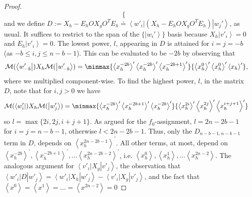 \documentclass{theoretics}
\begin{document}
\begin{proof}
\begin{displaymath}
\begin{cases}
    \end{cases}
  \end{displaymath}and we define $D:=X_{h}-E_{h}OX_{g}O^{T}E_{h}\doteq\left\langle w'_{i}\right|\left(X_{h}-E_{h}OX_{g}O^{T}E_{h}\right)\left|w_{j}'\right\rangle$, as usual.
  It suffices to restrict to the span of the $\{\left|w_{i}'\right\rangle \}$
  basis because $X_{h}\left|v'_{i}\right\rangle =0$ and $E_{h}\left|v'_{i}\right\rangle =0$.
  The lowest power, $l$, appearing in $D$ is attained for $i=j=-b$ (as $-b\le i,j\le n-b-1$).
  This can be evaluated to be $-2b$ by observing that
  \begin{displaymath}
    \mathcal{M}(\left\langle w'_{-b}\right|)X_{h}\mathcal{M}(\left|w'_{-b}\right\rangle )=\minmax{\left\langle x_{h}^{-2b}\right\rangle ^{\prime}\left\langle x_{h}^{-2b}\right\rangle ^{\prime}\left\langle x_{h}^{-2b+1}\right\rangle ^{\prime}}{\left\langle x_{h}^{0}\right\rangle ^{\prime}\left\langle x_{h}^{0}\right\rangle ^{\prime}\left\langle x_{h}\right\rangle ^{\prime}},
  \end{displaymath}
  where we multiplied component-wise. To find the highest power, $l$,
  in the matrix $D$, note that for $i,j>0$ we have
  \begin{displaymath}
    \mathcal{M}(\left\langle w'_{i}\right|)X_{h}\mathcal{M}(\left|w'_{j}\right\rangle )=\minmax{\left\langle x_{h}^{-2b}\right\rangle ^{\prime}\left\langle x_{h}^{-2b+1}\right\rangle ^{\prime}\left\langle x_{h}^{-2b}\right\rangle ^{\prime}}{\left\langle x_{h}^{2i}\right\rangle ^{\prime}\left\langle x_{h}^{2j}\right\rangle ^{\prime}\left\langle x_{h}^{i+j+1}\right\rangle ^{\prime}}
  \end{displaymath}
  so $l=\max\{2i,2j,i+j+1\}$. As argued for the $f_{0}$-assignment,
  $l=2n-2b-1$ for $i=j=n-b-1$, otherwise $l<2n-2b-1$.
  Thus, only the $D_{n-b-1,n-b-1}$ term in $D$, depends on $\left\langle x_{h}^{2n-2b-1}\right\rangle ^{\prime}$.
  All other terms, at most, depend on $\left\langle x_{h}^{-2b}\right\rangle ^{\prime},\left\langle x_{h}^{-2b+1}\right\rangle ^{\prime},\dots\left\langle x_{h}^{2n-2b-2}\right\rangle ^{\prime}$,
  i.e. $\left\langle x_{h}^{0}\right\rangle ,\left\langle x_{h}^{1}\right\rangle ,\dots\left\langle x_{h}^{2n-2}\right\rangle $.
  The analogous argument for $\left\langle v'_{i}\right|X_{g}\left|v'_{j}\right\rangle $,
  the observation that $\left\langle w'_{i}\right|D\left|w'_{j}\right\rangle =\left\langle w'_{i}\right|X_{h}\left|w'_{j}\right\rangle -\left\langle v'_{i}\right|X_{g}\left|v'_{j}\right\rangle $,
  and the fact that $\left\langle x^{0}\right\rangle =\left\langle x^{1}\right\rangle =\dots=\left\langle x^{2n-2}\right\rangle =0$

\end{proof}
\end{document}
